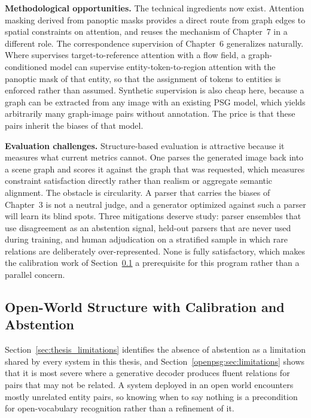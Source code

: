 \noindent \textbf{Methodological opportunities.}
The technical ingredients now exist. Attention masking derived from panoptic masks provides a direct route from graph edges to spatial constraints on attention, and reuses the mechanism of Chapter~7 in a different role. The correspondence supervision of Chapter~6 generalizes naturally. Where \leffa{} supervises target-to-reference attention with a flow field, a graph-conditioned model can supervise entity-token-to-region attention with the panoptic mask of that entity, so that the assignment of tokens to entities is enforced rather than assumed. Synthetic supervision is also cheap here, because a graph can be extracted from any image with an existing PSG model, which yields arbitrarily many graph-image pairs without annotation. The price is that these pairs inherit the biases of that model.

\noindent \textbf{Evaluation challenges.}
Structure-based evaluation is attractive because it measures what current metrics cannot. One parses the generated image back into a scene graph and scores it against the graph that was requested, which measures constraint satisfaction directly rather than realism or aggregate semantic alignment. The obstacle is circularity. A parser that carries the biases of Chapter~3 is not a neutral judge, and a generator optimized against such a parser will learn its blind spots. Three mitigations deserve study: parser ensembles that use disagreement as an abstention signal, held-out parsers that are never used during training, and human adjudication on a stratified sample in which rare relations are deliberately over-represented. None is fully satisfactory, which makes the calibration work of Section~\ref{sec:future_open_world} a prerequisite for this program rather than a parallel concern.

\subsection{Open-World Structure with Calibration and Abstention}
\label{sec:future_open_world}
Section~\ref{sec:thesis_limitations} identifies the absence of abstention as a limitation shared by every system in this thesis, and Section~\ref{openpsg:sec:limitations} shows that it is most severe where a generative decoder produces fluent relations for pairs that may not be related. A system deployed in an open world encounters mostly unrelated entity pairs, so knowing when to say nothing is a precondition for open-vocabulary recognition rather than a refinement of it.


